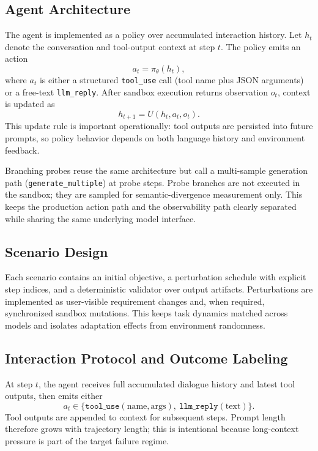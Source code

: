 \subsection{Agent Architecture}
The agent is implemented as a policy over accumulated interaction history. Let \(h_t\) denote the conversation and tool-output context at step \(t\). The policy emits an action
\[
a_t = \pi_\theta(h_t),
\]
where \(a_t\) is either a structured \texttt{tool\_use} call (tool name plus JSON arguments) or a free-text \texttt{llm\_reply}. After sandbox execution returns observation \(o_t\), context is updated as
\[
h_{t+1} = U(h_t, a_t, o_t).
\]
This update rule is important operationally: tool outputs are persisted into future prompts, so policy behavior depends on both language history and environment feedback.

Branching probes reuse the same architecture but call a multi-sample generation path (\texttt{generate\_multiple}) at probe steps. Probe branches are not executed in the sandbox; they are sampled for semantic-divergence measurement only. This keeps the production action path and the observability path clearly separated while sharing the same underlying model interface.

\subsection{Scenario Design}
Each scenario contains an initial objective, a perturbation schedule with explicit step indices, and a deterministic validator over output artifacts. Perturbations are implemented as user-visible requirement changes and, when required, synchronized sandbox mutations. This keeps task dynamics matched across models and isolates adaptation effects from environment randomness.

\subsection{Interaction Protocol and Outcome Labeling}
At step \(t\), the agent receives full accumulated dialogue history and latest tool outputs, then emits either
\begin{equation*}
a_t \in \{\texttt{tool\_use}(\text{name}, \text{args}),\ \texttt{llm\_reply}(\text{text})\}.
\end{equation*}
Tool outputs are appended to context for subsequent steps. Prompt length therefore grows with trajectory length; this is intentional because long-context pressure is part of the target failure regime.

